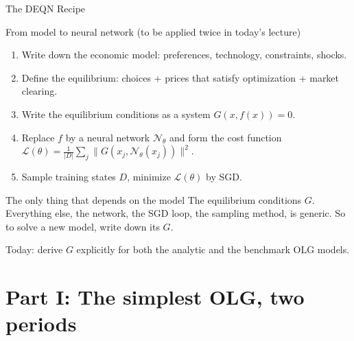 \documentclass[aspectratio=169,11pt]{beamer}
\newcommand{\emphc}[1]{\textcolor{harvardcrimson}{#1}}
\newcommand{\N}{\mathcal{N}}
\newcommand{\Loss}{\mathcal{L}}
\begin{document}
\begin{frame}{The DEQN Recipe}
\small
\begin{block}{From model to neural network (to be applied twice in today's lecture)}
\begin{enumerate}\itemsep2pt
    \item Write down the \emphc{economic model}: preferences, technology, constraints, shocks.
    \item Define the \emphc{equilibrium}: choices + prices that satisfy optimization + market clearing.
    \item Write the \emphc{equilibrium conditions} as a system $G(x, f(x)) = 0$.
    \item Replace $f$ by a \emphc{neural network} $\N_\theta$ and form the \emphc{cost function} $\Loss(\theta) = \frac{1}{|D|}\sum_j \|G(x_j, \N_\theta(x_j))\|^2$.
    \item Sample training states $D$, minimize $\Loss(\theta)$ by SGD.
\end{enumerate}
\end{block}

\begin{alertblock}{The only thing that depends on the model}
The \emphc{equilibrium conditions $G$}.  Everything else, the network, the SGD loop, the sampling method, is generic.  \emphc{So to solve a new model, write down its $G$.}
\end{alertblock}

\vspace{0.2em}
{\footnotesize Today: derive $G$ explicitly for both the analytic and the benchmark OLG models.}
\end{frame}



\section{Part I\textonehalf: The simplest OLG, two periods}
\end{document}
